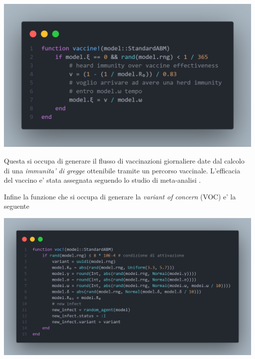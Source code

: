 \begin{minipage}{\linewidth}
	\centering
	\includegraphics[width=\textwidth]{img/vaccine.png}
	\label{fig:vaccine}
\end{minipage}

Questa si occupa di generare il flusso di vaccinazioni giornaliere date dal
calcolo di una \emph{immunita' di gregge} ottenibile tramite un 
percorso vaccinale.\cite{wiki:Immunità_di_gregge}
L'efficacia del vaccino e' stata assegnata seguendo lo studio di meta-analisi \cite{Wu2023-zd}.

Infine la funzione che si occupa di generare la \emph{variant of concern} (VOC) e' la seguente

\begin{minipage}{\linewidth}
	\centering
	\includegraphics[width=\textwidth]{img/voc.png}
	\label{fig:voc}
\end{minipage}

